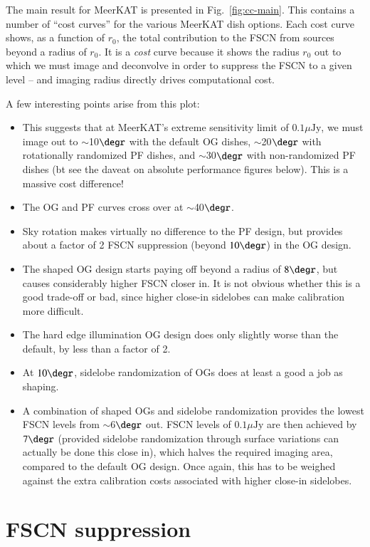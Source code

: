 \documentclass{aa}
\begin{document}
The main result for MeerKAT is presented in Fig.~\ref{fig:cc-main}. This contains a number of ``cost curves'' for the various MeerKAT dish options. Each cost curve shows, as a function of $r_0$, the total contribution to the FSCN from sources beyond a radius of $r_0$. It is a \emph{cost} curve because it shows the radius $r_0$ out to which we must image and deconvolve in order to suppress the FSCN to a given level -- and imaging radius directly drives computational cost. 

A few interesting points arise from this plot:

\begin{itemize}
  \item This suggests that at MeerKAT's extreme sensitivity limit of $0.1 \mu\mathrm{Jy}$, we must image out to $\sim$10$\degr$ with the default OG dishes, $\sim$20$\degr$ with rotationally randomized PF dishes, and $\sim$30$\degr$ with non-randomized PF dishes (bt see the daveat on absolute performance figures below). This is a massive cost difference!
  \item The OG and PF curves cross over at $\sim$40$\degr$.
  \item Sky rotation makes virtually no difference to the PF design, but provides about a factor of 2 FSCN suppression (beyond $10\degr$) in the OG design.
  \item The shaped OG design starts paying off beyond a radius of $8\degr$, but causes considerably higher FSCN closer in. It is not obvious whether this is a good trade-off or bad, since higher close-in sidelobes can make calibration more difficult.
  \item The hard edge illumination OG design does only slightly worse than the default, by less than a factor of 2.
  \item At $10\degr$, sidelobe randomization of OGs does at least a good a job as shaping.
  \item A combination of shaped OGs and sidelobe randomization provides the lowest FSCN levels from $\sim$6$\degr$ out.
  FSCN levels of $0.1 \mu\mathrm{Jy}$ are then achieved by $7\degr$ (provided sidelobe randomization through surface variations can actually be done this close in), which halves the required imaging area, compared to the default OG design. Once again, this has to be weighed against the extra calibration costs associated with higher close-in sidelobes.
\end{itemize}

\section{FSCN suppression}
\end{document}
